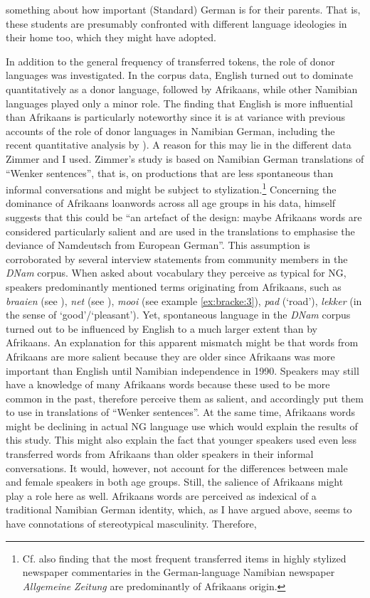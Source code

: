\documentclass[output=paper]{langsci/langscibook}
\begin{document}
something about how important (Standard) German is for their parents. That is, these students are presumably confronted with different language ideologies in their home too, which they might have adopted.

In addition to the general frequency of transferred tokens, the role of donor languages was investigated. In the corpus data, English turned out to dominate quantitatively as a donor language, followed by Afrikaans, while other Namibian languages played only a minor role. The finding that English is more influential than Afrikaans is particularly noteworthy since it is at variance with previous accounts of the role of donor languages in Namibian German, including the recent quantitative analysis by \citealt{zimmer_linguisticvar_toappear}). A reason for this may lie in the different data Zimmer and I used. Zimmer’s study is based on Namibian German translations of “Wenker sentences”, that is, on productions that are less spontaneous than informal conversations and might be subject to stylization.\footnote{Cf. also  finding that the most frequent transferred items in highly stylized newspaper commentaries in the German-language Namibian newspaper \textit{Allgemeine} \textit{Zeitung} are predominantly of Afrikaans origin.} Concerning the dominance of Afrikaans loanwords across all age groups in his data, \citet{zimmer_linguisticvar_toappear} himself suggests that this could be “an artefact of the design: maybe Afrikaans words are considered particularly salient and are used in the translations to emphasise the deviance of Namdeutsch from European German”. This assumption is corroborated by several interview statements from community members in the \textit{DNam} corpus. When asked about vocabulary they perceive as typical for NG, speakers predominantly mentioned terms originating from Afrikaans, such as \textit{braaien} (see ), \textit{net} (see ), \textit{mooi} (see example \ref{ex:bracke:3}), \textit{pad} (‘road’), \textit{lekker} (in the sense of ‘good’/‘pleasant’). Yet, spontaneous language in the \textit{DNam} corpus turned out to be influenced by English to a much larger extent than by Afrikaans. An explanation for this apparent mismatch might be that words from Afrikaans are more salient because they are older since Afrikaans was more important than English until Namibian independence in 1990. Speakers may still have a knowledge of many Afrikaans words because these used to be more common in the past, therefore perceive them as salient, and accordingly put them to use in translations of “Wenker sentences”. At the same time, Afrikaans words might be declining in actual NG language use which would explain the results of this study. This might also explain the fact that younger speakers used even less transferred words from Afrikaans than older speakers in their informal conversations. It would, however, not account for the differences between male and female speakers in both age groups. Still, the salience of Afrikaans might play a role here as well. Afrikaans words are perceived as indexical of a traditional Namibian German identity, which, as I have argued above, seems to have connotations of stereotypical masculinity. Therefore, 
\end{document}
